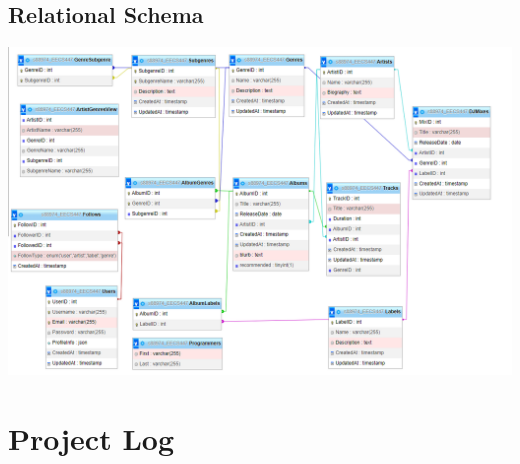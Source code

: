 \documentclass{article}
\begin{document}
\subsection{Relational Schema}

\includegraphics[width=\linewidth]{relational_schema.png}


\section{Project Log}
\end{document}
